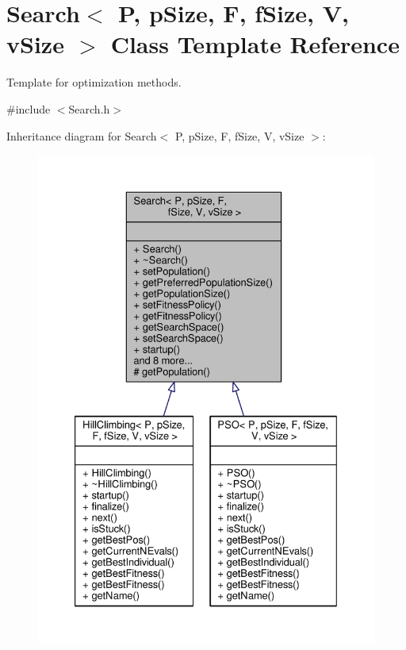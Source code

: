 \hypertarget{classSearch}{}\section{Search$<$ P, p\+Size, F, f\+Size, V, v\+Size $>$ Class Template Reference}
\label{classSearch}


Template for optimization methods.  




{\ttfamily \#include $<$Search.\+h$>$}



Inheritance diagram for Search$<$ P, p\+Size, F, f\+Size, V, v\+Size $>$\+:\nopagebreak
\begin{figure}[H]
\begin{center}
\leavevmode
\includegraphics[width=350pt]{classSearch__inherit__graph}
\end{center}
\end{figure}


